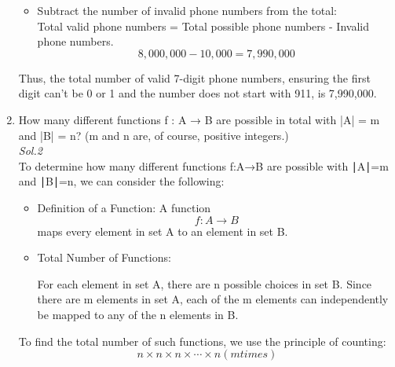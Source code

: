 \documentclass{book}
\begin{document}
\begin{enumerate}
\begin{itemize}
\begin{enumerate}
		            \end{enumerate}
		      \item Subtract the number of invalid phone numbers from the total:\\

		            Total valid phone numbers = Total possible phone numbers - Invalid phone numbers.\\
		            \[
			            8,000,000−10,000=7,990,000
		            \]
	      \end{itemize}
	      Thus, the total number of valid 7-digit phone numbers, ensuring the first digit can't be 0 or 1 and the number does not start with 911, is 7,990,000.
	\item How many different functions f : A → B are possible in total
	      with |A| = m and |B| = n? (m and n are, of course, positive
	      integers.)\\
	      \textit{ Sol.2}\\

	      To determine how many different functions
	      f:A→B are possible with
	      ∣A∣=m and ∣B∣=n, we can consider the following:
	      \begin{itemize}
		      \item
		            Definition of a Function: A function
		            \[
			            f:A\rightarrow B
		            \] maps every element in set
		            A to an element in set
		            B.
		      \item
		            Total Number of Functions:

		            For each element in set
		            A, there are
		            n possible choices in set
		            B.
		            Since there are
		            m elements in set
		            A, each of the
		            m elements can independently be mapped to any of the
		            n elements in
		            B.

	      \end{itemize}

	      To find the total number of such functions, we use the principle of counting:
	      \[
		      n×n×n×⋯×n(m times)
	      \]


\end{enumerate}
\end{document}
